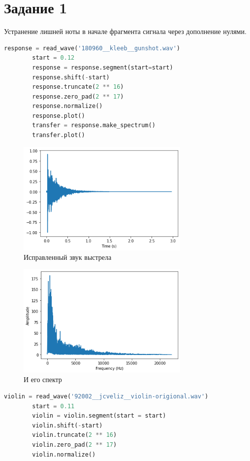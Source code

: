 \documentclass[a4paper, 12pt]{report}
\begin{document}
	\section{Задание 1}
	Устранение лишней ноты в начале фрагмента сигнала через дополнение нулями.
	\begin{lstlisting}[language=Python,caption=Сначала возьмём звук выстрела]
		response = read_wave('180960__kleeb__gunshot.wav')
		start = 0.12
		response = response.segment(start=start)
		response.shift(-start)
		response.truncate(2 ** 16)
		response.zero_pad(2 ** 17)
		response.normalize()
		response.plot()
		transfer = response.make_spectrum()
		transfer.plot()
	\end{lstlisting}
	\begin{figure}[H]
		\centering
		\includegraphics[width=0.75\textwidth]{task1.png}
		\caption{Исправленный звук выстрела}
		\label{fig:task1}
	\end{figure}
	\begin{figure}[H]
		\centering
		\includegraphics[width=0.75\textwidth]{task2.png}
		\caption{И его спектр}
		\label{fig:task2}
	\end{figure}
	\begin{lstlisting}[language=Python,caption=Теперь попробуем с сигналом скрипки]
		violin = read_wave('92002__jcveliz__violin-origional.wav')
		start = 0.11
		violin = violin.segment(start = start)
		violin.shift(-start)
		violin.truncate(2 ** 16)
		violin.zero_pad(2 ** 17)
		violin.normalize()
	\end{lstlisting}
\end{document}

